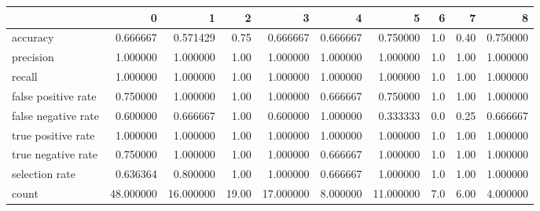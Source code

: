 \begin{tabular}{lrrrrrrrrr}
\toprule
{} &          0 &          1 &      2 &          3 &         4 &          5 &    6 &     7 &         8 \\
\midrule
accuracy            &   0.666667 &   0.571429 &   0.75 &   0.666667 &  0.666667 &   0.750000 &  1.0 &  0.40 &  0.750000 \\
precision           &   1.000000 &   1.000000 &   1.00 &   1.000000 &  1.000000 &   1.000000 &  1.0 &  1.00 &  1.000000 \\
recall              &   1.000000 &   1.000000 &   1.00 &   1.000000 &  1.000000 &   1.000000 &  1.0 &  1.00 &  1.000000 \\
false positive rate &   0.750000 &   1.000000 &   1.00 &   1.000000 &  0.666667 &   0.750000 &  1.0 &  1.00 &  1.000000 \\
false negative rate &   0.600000 &   0.666667 &   1.00 &   0.600000 &  1.000000 &   0.333333 &  0.0 &  0.25 &  0.666667 \\
true positive rate  &   1.000000 &   1.000000 &   1.00 &   1.000000 &  1.000000 &   1.000000 &  1.0 &  1.00 &  1.000000 \\
true negative rate  &   0.750000 &   1.000000 &   1.00 &   1.000000 &  0.666667 &   1.000000 &  1.0 &  1.00 &  1.000000 \\
selection rate      &   0.636364 &   0.800000 &   1.00 &   1.000000 &  0.666667 &   1.000000 &  1.0 &  1.00 &  1.000000 \\
count               &  48.000000 &  16.000000 &  19.00 &  17.000000 &  8.000000 &  11.000000 &  7.0 &  6.00 &  4.000000 \\
\bottomrule
\end{tabular}
